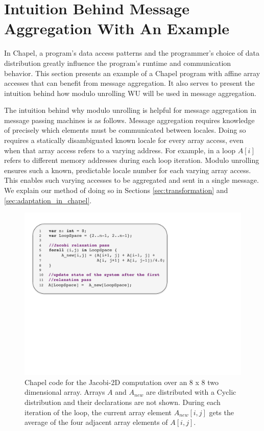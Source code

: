 \section{Intuition Behind Message Aggregation With An Example}\label{sec:motivation_for_aggregation} 

In Chapel, a program's data access patterns and the programmer's choice of data distribution greatly influence the program's runtime and communication behavior. This section presents an example of a Chapel program with affine array accesses that can benefit from message aggregation. It also serves to present the intuition behind how modulo unrolling WU will be used in message aggregation. 

The intuition behind why modulo unrolling is helpful for message aggregation in message passing machines is as follows. Message aggregation requires knowledge of precisely which elements must be communicated between locales. Doing so requires a statically disambiguated known locale for every array access, even when that array access refers to a varying address. For example, in a loop $A[i]$ refers to different memory addresses during each loop iteration. Modulo unrolling ensures such a known, predictable locale number for each varying array access. This enables such varying accesses to be aggregated and sent in a single message. We explain our method of doing so in Sections \ref{sec:transformation} and \ref{sec:adaptation_in_chapel}.

\begin{figure}
\begin{center}
\includegraphics[scale=0.42]{./Figures/jacobi}
\caption{Chapel code for the Jacobi-2D computation over an 8 x 8 two dimensional array. Arrays $A$ and $A_{new}$ are distributed with a Cyclic distribution and their declarations are not shown. During each iteration of the loop, the current array element $A_{new}[i, j]$ gets the average of the four adjacent array elements of $A[i, j]$.}
\label{jacobi_code}
\end{center}
\end{figure}

